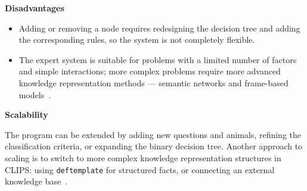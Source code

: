 \documentclass[a4paper,final]{article}
\begin{document}
\textbf{Disadvantages}

\begin{itemize}
	\item Adding or removing a node requires redesigning the decision tree and adding the corresponding rules, so the system is not completely flexible.
	\item The expert system is suitable for problems with a limited number of factors and simple interactions; more complex problems require more advanced knowledge representation methods --- semantic networks and frame-based models~\cite{gavrilova}.
\end{itemize}

\textbf{Scalability}

The program can be extended by adding new questions and animals, refining the classification criteria, or expanding the binary decision tree. Another approach to scaling is to switch to more complex knowledge representation structures in CLIPS: using \texttt{deftemplate} for structured facts, or connecting an external knowledge base~\cite{habаров}.
\end{document}
